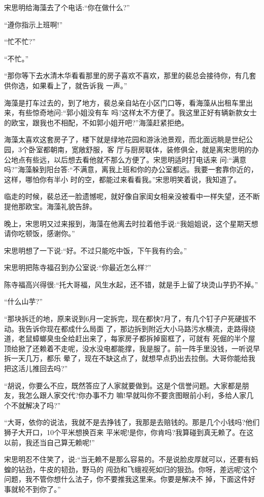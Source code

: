 \documentclass[11pt,a4paper,onecolumn]{article}
\begin{document}
宋思明给海藻去了个电话:``你在做什么?''

``遵你指示上班啊!''

``忙不忙?''

``不忙。''

``那你等下去水清木华看看那里的房子喜欢不喜欢，那里的裴总会接待你，有几套供你选，如果看上了，就告诉我
一声。''

海藻是打车过去的，到了地方，裴总亲自站在小区门口等，看海藻从出租车里出来，有些惊奇地问:``郭小姐没有车
吗?这样太不方便了。我这里正好有辆新款女士的欧宝，跟我也不相配，不如郭小姐开吧?''海藻赶紧拒绝。

海藻太喜欢这套房子了，楼下就是绿地花园和游泳池景观，而北面远眺是世纪公园，3个卧室都朝南，宽敞舒服，客
厅与厨房联体，装修俱全，就是离宋思明的办公地点有些远，以后想去看他就不那么方便了。宋思明适时打电话来
问:``满意吗?''海藻躲到阳台答:``不满意，离我上班和你的办公室都远。我要一套靠你近的，这样，哪怕你有半小
时的空，都能过来看看我。''宋思明笑着说，我知道了。

临走的时候，裴总还一脸遗憾呢，就好像自家闺女相亲没被看中一样失望，还不断提他那欧宝。海藻礼貌告辞。

晚上，宋思明又过来报到，海藻在他离去时拉着他手说:``我姐姐说，这个星期天想请你吃顿饭，感谢你。''

宋思明想了一下说:``好。不过只能吃中饭，下午我有约会。''

宋思明把陈寺福召到办公室说:``你最近怎么样?''

陈寺福高兴得很:``托大哥福，风生水起，还不错，就是手上留了块烫山芋扔不掉。''

``什么山芋?''

``那块拆迁的地，原来说到6月一定拆完，现在都快7月了，有几个钉子户死硬拔不动。我告诉你现在都成什么局面
了，那边拆到附近大小马路污水横流，走路得绕道，老鼠蟑螂臭虫全给赶出来了，每家房子都拆掉窗框了，可就有
死倔的半个屋顶给掀了还赖着不走呢，没水没电都能撑，我是服了。前一阵手里没钱，一听说早拆一天几万，都乐
晕了，现在不缺这点了，就想早点扔出去拉倒。大哥你能给我把这活儿推回去吗?''

``胡说，你要么不应，既然答应了人家就要做到。这是个信誉问题。大家都是朋友，我怎么跟人家交代?你办事不力
嘛!早就叫你不要贪图眼前小利，多给人家几个不就解决了吗?''

``大哥，依你的说法，我就不是去挣钱了，我那是去赔钱的。那是几个小钱吗?他们狮子大开口，10个平米想换百来
平米呢!是你，你肯吗?我算碰到真无赖了。在这以前，我还当自己算无赖呢!''

宋思明忍不住笑了，说:``当无赖不是那么容易的。不是说脸皮厚就可以，还要有蚂蝗的钻劲，牛皮的韧劲，野马的
闯劲和飞蛾视死如归的狠劲。你呀，差远呢!这个问题，我不管你想什么法子，你不要推我这里来。你要是解决不
掉，下面这件好事就轮不到你了。''
\end{document}
